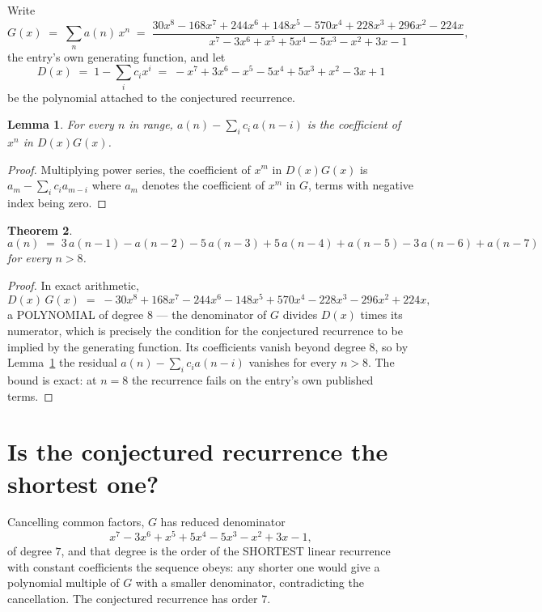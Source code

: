 \documentclass[11pt,a4paper]{article}
\theoremstyle{plain}
\newtheorem{theorem}{Theorem}
\newtheorem{lemma}[theorem]{Lemma}
\theoremstyle{definition}
\begin{document}
Write
\[
G(x)\;=\;\sum_{n}a(n)\,x^{n}\;=\;\frac{30 x^{8} - 168 x^{7} + 244 x^{6} + 148 x^{5} - 570 x^{4} + 228 x^{3} + 296 x^{2} - 224 x}{x^{7} - 3 x^{6} + x^{5} + 5 x^{4} - 5 x^{3} - x^{2} + 3 x - 1},
\]
the entry's own generating function, and let
\[
D(x)\;=\;1-\sum_i c_i x^{i}\;=\;- x^{7} + 3 x^{6} - x^{5} - 5 x^{4} + 5 x^{3} + x^{2} - 3 x + 1
\]
be the polynomial attached to the conjectured recurrence.

\begin{lemma}\label{lem:key}
For every $n$ in range, $a(n)-\sum_i c_i\,a(n-i)$ is the coefficient of $x^{n}$ in
$D(x)G(x)$.
\end{lemma}

\begin{proof}
Multiplying power series, the coefficient of $x^{m}$ in $D(x)G(x)$ is
$a_m-\sum_i c_i a_{m-i}$ where $a_m$ denotes the coefficient of $x^{m}$ in $G$, terms with
negative index being zero.
\end{proof}

\begin{theorem}
\[
a(n)\;=\;3\,a(n-1) - a(n-2) - 5\,a(n-3) + 5\,a(n-4) + a(n-5) - 3\,a(n-6) + a(n-7)
\]
for every $n>8$.
\end{theorem}

\begin{proof}
In exact arithmetic,
\[
D(x)\,G(x)\;=\;- 30 x^{8} + 168 x^{7} - 244 x^{6} - 148 x^{5} + 570 x^{4} - 228 x^{3} - 296 x^{2} + 224 x,
\]
a POLYNOMIAL of degree $8$ --- the denominator of $G$ divides $D(x)$ times its numerator,
which is precisely the condition for the conjectured recurrence to be implied by the
generating function. Its coefficients vanish beyond degree $8$, so by
Lemma~\ref{lem:key} the residual $a(n)-\sum_ic_ia(n-i)$ vanishes for every
$n>8$. The bound is exact: at $n=8$ the recurrence fails on the entry's own published terms.
\end{proof}

\section{Is the conjectured recurrence the shortest one?}

Cancelling common factors, $G$ has reduced denominator
\[
x^{7} - 3 x^{6} + x^{5} + 5 x^{4} - 5 x^{3} - x^{2} + 3 x - 1,
\]
of degree $7$, and that degree is the order of the SHORTEST linear recurrence with
constant coefficients the sequence obeys: any shorter one would give a polynomial multiple of
$G$ with a smaller denominator, contradicting the cancellation. The conjectured recurrence has
order $7$.
\end{document}
